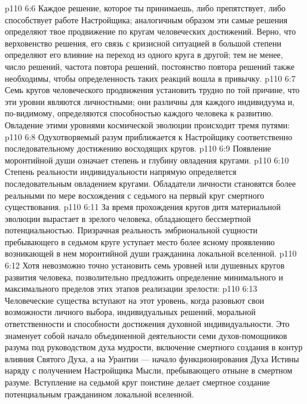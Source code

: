 \vs p110 6:6 \pc Каждое решение, которое ты принимаешь, либо препятствует, либо способствует работе Настройщика; аналогичным образом эти самые решения определяют твое продвижение по кругам человеческих достижений. Верно, что верховенство решения, его связь с кризисной ситуацией в большой степени определяют его влияние на переход из одного круга в другой; тем не менее, число решений, частота повтора решений, постоянство повтора решений также необходимы, чтобы определенность таких реакций вошла в привычку.
\vs p110 6:7 Семь кругов человеческого продвижения установить трудно по той причине, что эти уровни являются личностными; они различны для каждого индивидуума и, по\hyp{}видимому, определяются способностью каждого человека к развитию. Овладение этими уровнями космической эволюции происходит тремя путями:
\vs p110 6:8 \bibnobreakspace {} Одухотворяемый разум приближается к Настройщику соответственно последовательному достижению восходящих кругов.
\vs p110 6:9 \pc {}\bibnobreakspace {} Появление моронтийной души означает степень и глубину овладения кругами.
\vs p110 6:10 \pc {}\bibnobreakspace {} Степень реальности индивидуальности напрямую определяется последовательным овладением кругами. Обладатели личности становятся более реальными по мере восхождения с седьмого на первый круг смертного существования.
\vs p110 6:11 \pc За время прохождения кругов дитя материальной эволюции вырастает в зрелого человека, обладающего бессмертной потенциальностью. Призрачная реальность эмбриональной сущности пребывающего в седьмом круге уступает место более ясному проявлению возникающей в нем моронтийной души гражданина локальной вселенной.
\vs p110 6:12 Хотя невозможно точно установить семь уровней или душевных кругов развития человека, позволительно предложить определение минимального и максимального пределов этих этапов реализации зрелости:
\vs p110 6:13 \pc {} Человеческие существа вступают на этот уровень, когда разовьют свои возможности личного выбора, индивидуальных решений, моральной ответственности и способности достижения духовной индивидуальности. Это знаменует собой начало объединенной деятельности семи духов\hyp{}помощников разума под руководством духа мудрости, включение смертного создания в контур влияния Святого Духа, а на Урантии --- начало функционирования Духа Истины наряду с получением Настройщика Мысли, пребывающего отныне в смертном разуме. Вступление на седьмой круг поистине делает смертное создание потенциальным гражданином локальной вселенной.

